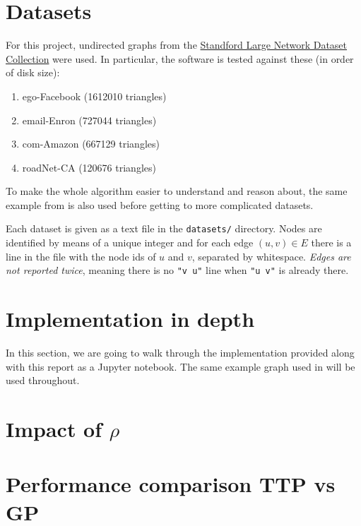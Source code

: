 \documentclass[paper=a4, fontsize=11pt]{scrartcl}
\begin{document}
\section{Datasets}
For this project, undirected graphs from the
\href{http://snap.stanford.edu/data/index.html}{Standford Large Network Dataset
Collection} were used. In particular, the software is tested against these (in
order of disk size):
\begin{enumerate}
    \item ego-Facebook (1612010 triangles)
    \item email-Enron (727044 triangles)
    \item com-Amazon (667129 triangles)
    \item roadNet-CA (120676 triangles)
\end{enumerate}

To make the whole algorithm easier to understand and reason about, the same
example from \cite{park2013efficient} is also used before getting to more
complicated datasets.

Each dataset is given as a text file in the \texttt{datasets/}
directory. Nodes are identified by means of a unique integer and for each edge
$(u,v) \in E$ there is a line in the file with the node ids of $u$ and $v$,
separated by whitespace. \emph{Edges are not reported twice}, meaning there is
no \texttt{"v u"} line when \texttt{"u v"} is already there.

\section{Implementation in depth}
In this section, we are going to walk through the implementation provided along
with this report as a Jupyter notebook. The same example graph used in
\cite{park2013efficient} will be used throughout.

\section{Impact of $\rho$}

\section{Performance comparison TTP vs GP}



\end{document}
